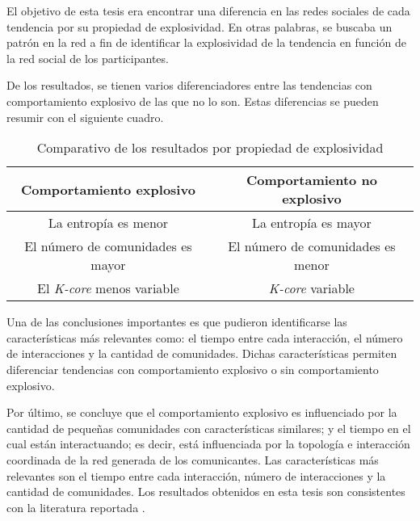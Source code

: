\documentclass[../main.tex]{subfiles}
\begin{document}




\onehalfspacing

El objetivo de esta tesis era encontrar una diferencia en las redes sociales de cada tendencia por su propiedad de explosividad. En otras palabras, se buscaba un patrón en la red a fin de identificar la explosividad de la tendencia en función de la red social de los participantes. 


De los resultados, se tienen varios diferenciadores entre las tendencias con comportamiento explosivo de las que no lo son. Estas diferencias se pueden resumir con el siguiente cuadro. 

\begin{table}[h!]
    \centering
    \caption{Comparativo de los resultados por propiedad de explosividad}
    \begin{tabular}{c|c}
        \textbf{Comportamiento explosivo} & \textbf{Comportamiento no explosivo} \\
        \hline
        La entropía es menor & La entropía es mayor \\
        El número de comunidades es mayor & El número de comunidades es menor \\
        El \textit{K-core} menos variable & \textit{K-core} variable
        
    \end{tabular}
    
    \label{tab:conclusiones_comparativo}
\end{table}
    
    
Una de las conclusiones importantes es que pudieron identificarse las características más relevantes como: el tiempo entre cada interacción, el número de interacciones y la cantidad de comunidades. Dichas características permiten diferenciar tendencias con comportamiento explosivo o sin comportamiento explosivo.

Por último, se concluye que el comportamiento explosivo es influenciado por la cantidad de pequeñas comunidades con características similares; y el tiempo en el cual están interactuando; es decir, está influenciada por la topología e interacción coordinada de la red generada de los comunicantes. Las características más relevantes son el tiempo entre cada interacción, número de interacciones y la cantidad de comunidades. Los resultados obtenidos en esta tesis  son consistentes con la literatura reportada \cite{D_Weng2013,D_weng2014predicting}.
\end{document}
